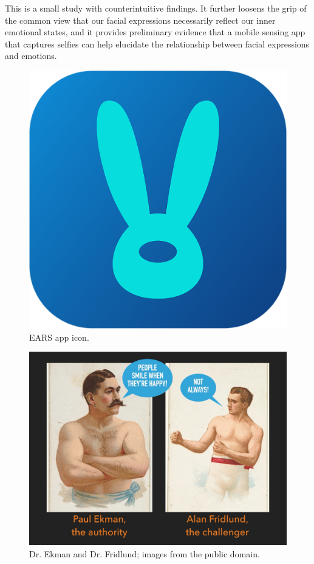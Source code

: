 \documentclass[authordate, empirical]{jote-new-article}
\begin{document}
\begin{takeHomeMessage}

  This is a small study with counterintuitive findings. It further loosens the grip of the common view that our facial expressions necessarily reflect our inner emotional states, and it provides preliminary evidence that a mobile sensing app that captures selfies can help elucidate the relationship between facial expressions and emotions.

\end{takeHomeMessage}





\begin{figure}[b]
  \begin{fullwidth}
    \centering
    \includegraphics[width=.5\linewidth]{media/image1.png}

    \caption{EARS app icon.}
  \end{fullwidth}

  \label{fig:rId8}



\end{figure}


\begin{figure}[b!]
  \begin{fullwidth}
    \centering
    \includegraphics[width=.8\linewidth]{media/image2.jpeg}

    \caption{Dr. Ekman and Dr. Fridlund; images from the public domain.}
  \end{fullwidth}

  \label{fig:rId9}


\end{figure}
\end{document}

